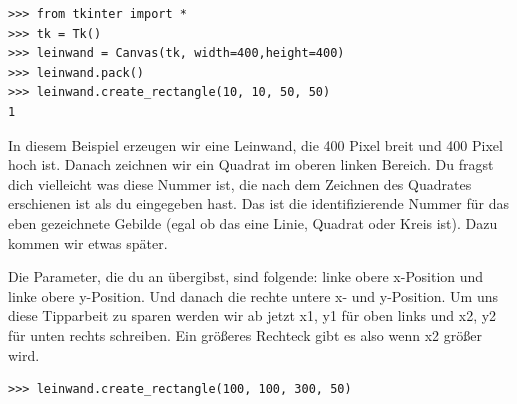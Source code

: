 \begin{Verbatim}[frame=single]
>>> from tkinter import *
>>> tk = Tk()
>>> leinwand = Canvas(tk, width=400,height=400)
>>> leinwand.pack()
>>> leinwand.create_rectangle(10, 10, 50, 50)
1
\end{Verbatim}
In diesem Beispiel erzeugen wir eine Leinwand, die 400 Pixel breit und 400 Pixel hoch ist. Danach zeichnen wir ein Quadrat im oberen linken Bereich. Du fragst dich vielleicht was diese Nummer ist, die nach dem Zeichnen des Quadrates erschienen ist als du  eingegeben hast. Das ist die identifizierende Nummer für das eben gezeichnete Gebilde (egal ob das eine Linie, Quadrat oder Kreis ist). Dazu kommen wir etwas später.

Die Parameter, die du an  übergibst, sind folgende: linke obere x-Position und linke obere y-Position. Und danach die rechte untere x- und y-Position. Um uns diese Tipparbeit zu sparen werden wir ab jetzt x1, y1 für oben links und x2, y2 für unten rechts schreiben. Ein größeres Rechteck gibt es also wenn x2 größer wird.

\begin{Verbatim}[frame=single]
>>> leinwand.create_rectangle(100, 100, 300, 50)
\end{Verbatim}

